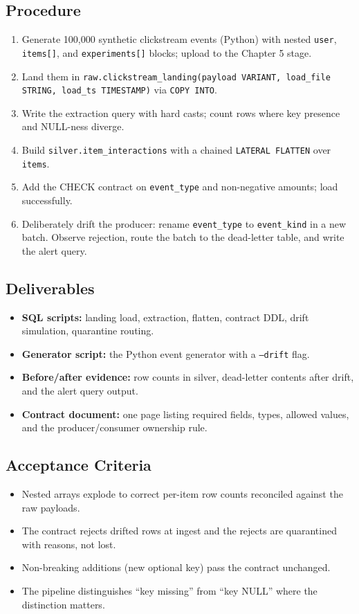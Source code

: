 \subsection*{Procedure}
\begin{enumerate}
    \item Generate 100{,}000 synthetic clickstream events (Python) with nested \texttt{user}, \texttt{items[]}, and \texttt{experiments[]} blocks; upload to the Chapter 5 stage.
    \item Land them in \texttt{raw.clickstream\_landing(payload VARIANT, load\_file STRING, load\_ts TIMESTAMP)} via \texttt{COPY INTO}.
    \item Write the extraction query with hard casts; count rows where key presence and NULL-ness diverge.
    \item Build \texttt{silver.item\_interactions} with a chained \texttt{LATERAL FLATTEN} over \texttt{items}.
    \item Add the CHECK contract on \texttt{event\_type} and non-negative amounts; load successfully.
    \item Deliberately drift the producer: rename \texttt{event\_type} to \texttt{event\_kind} in a new batch. Observe rejection, route the batch to the dead-letter table, and write the alert query.
\end{enumerate}

\subsection*{Deliverables}
\begin{itemize}
    \item \textbf{SQL scripts:} landing load, extraction, flatten, contract DDL, drift simulation, quarantine routing.
    \item \textbf{Generator script:} the Python event generator with a \texttt{--drift} flag.
    \item \textbf{Before/after evidence:} row counts in silver, dead-letter contents after drift, and the alert query output.
    \item \textbf{Contract document:} one page listing required fields, types, allowed values, and the producer/consumer ownership rule.
\end{itemize}

\subsection*{Acceptance Criteria}
\begin{itemize}
    \item Nested arrays explode to correct per-item row counts reconciled against the raw payloads.
    \item The contract rejects drifted rows at ingest and the rejects are quarantined with reasons, not lost.
    \item Non-breaking additions (new optional key) pass the contract unchanged.
    \item The pipeline distinguishes ``key missing'' from ``key NULL'' where the distinction matters.
\end{itemize}

